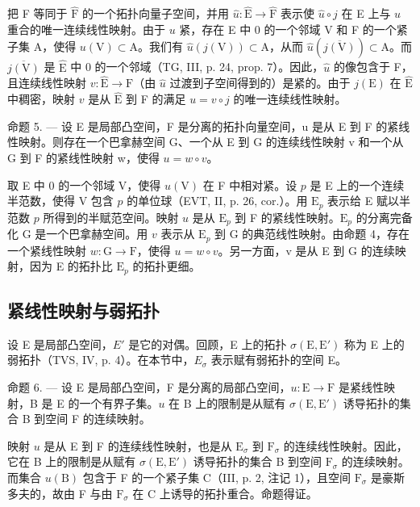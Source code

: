 把 F 等同于 \(\widehat{\mathrm{F}}\) 的一个拓扑向量子空间，并用 \(\widehat{u}\colon \widehat{\mathrm{E}}\to \widehat{\mathrm{F}}\) 表示使 \(\widehat{u}\circ j\) 在 E 上与 \(u\) 重合的唯一连续线性映射。由于 \(u\) 紧，存在 E 中 0 的一个邻域 V 和 F 的一个紧子集 A，使得 \(u(\mathrm{V})\subset \mathrm{A}\)。我们有 \(\widehat{u}(j(\mathrm{V}))\subset \mathrm{A}\)，从而 \(\widehat{u} (\overline{j(\mathrm{V})})\subset \mathrm{A}\)。而 \(\overline{j(\mathrm{V})}\) 是 \(\widehat{\mathrm{E}}\) 中 0 的一个邻域（TG, III, p. 24, prop. 7）。因此，\(\widehat{u}\) 的像包含于 F，且连续线性映射 \(v\colon \widehat{\mathrm{E}}\rightarrow \mathrm{F}\)（由 \(\widehat{u}\) 过渡到子空间得到的）是紧的。由于 \(j(\mathrm{E})\) 在 \(\widehat{\mathrm{E}}\) 中稠密，映射 \(v\) 是从 \(\widehat{\mathrm{E}}\) 到 F 的满足 \(u = v\circ j\) 的唯一连续线性映射。

命题 5. --- 设 E 是局部凸空间，F 是分离的拓扑向量空间，u 是从 E 到 F 的紧线性映射。则存在一个巴拿赫空间 G、一个从 E 到 G 的连续线性映射 v 和一个从 G 到 F 的紧线性映射 w，使得 \(u = w \circ v\)。

取 E 中 0 的一个邻域 V，使得 \(u(\mathrm{V})\) 在 F 中相对紧。设 \(p\) 是 E 上的一个连续半范数，使得 V 包含 \(p\) 的单位球（EVT, II, p. 26, cor.）。用 \(\mathrm{E}_p\) 表示给 E 赋以半范数 \(p\) 所得到的半赋范空间。映射 \(u\) 是从 \(\mathrm{E}_p\) 到 F 的紧线性映射。\(\mathrm{E}_p\) 的分离完备化 G 是一个巴拿赫空间。用 \(v\) 表示从 \(\mathrm{E}_p\) 到 G 的典范线性映射。由命题 4，存在一个紧线性映射 \(w: \mathrm{G} \to \mathrm{F}\)，使得 \(u = w \circ v\)。另一方面，v 是从 E 到 G 的连续映射，因为 E 的拓扑比 \(\mathrm{E}_p\) 的拓扑更细。

\subsection{紧线性映射与弱拓扑}

设 E 是局部凸空间，\(E'\) 是它的对偶。回顾，E 上的拓扑 \(\sigma(\mathrm{E},\mathrm{E}')\) 称为 E 上的弱拓扑（TVS, IV, p. 4）。在本节中，\(E_{\sigma}\) 表示赋有弱拓扑的空间 E。

命题 6. --- 设 E 是局部凸空间，F 是分离的局部凸空间，\(u: \mathrm{E} \to \mathrm{F}\) 是紧线性映射，B 是 E 的一个有界子集。\(u\) 在 B 上的限制是从赋有 \(\sigma(\mathrm{E}, \mathrm{E}')\) 诱导拓扑的集合 B 到空间 F 的连续映射。

映射 \(u\) 是从 E 到 F 的连续线性映射，也是从 \(\mathrm{E}_{\sigma}\) 到 \(\mathrm{F}_{\sigma}\) 的连续线性映射。因此，它在 B 上的限制是从赋有 \(\sigma(\mathrm{E}, \mathrm{E}')\) 诱导拓扑的集合 B 到空间 \(\mathrm{F}_{\sigma}\) 的连续映射。而集合 \(u(\mathrm{B})\) 包含于 F 的一个紧子集 C（III, p. 2, 注记 1），且空间 \(\mathrm{F}_{\sigma}\) 是豪斯多夫的，故由 F 与由 \(\mathrm{F}_{\sigma}\) 在 C 上诱导的拓扑重合。命题得证。

